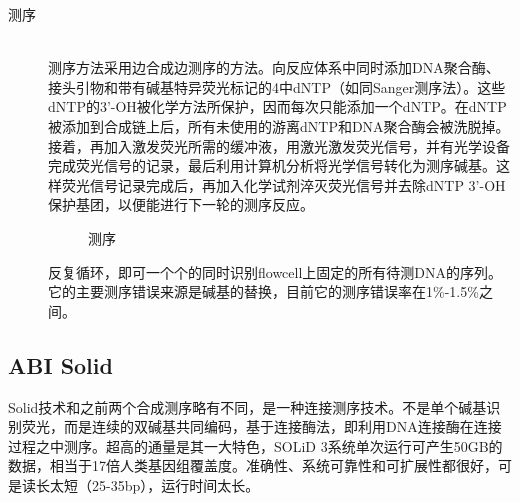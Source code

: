 \documentclass[12pt]{article} %
\begin{document}
\begin{description}
	\item[测序] \hfill \\
	测序方法采用边合成边测序的方法。向反应体系中同时添加DNA聚合酶、接头引物和带有碱基特异荧光标记的4中dNTP（如同Sanger测序法）。这些dNTP的3’-OH被化学方法所保护，因而每次只能添加一个dNTP。在dNTP被添加到合成链上后，所有未使用的游离dNTP和DNA聚合酶会被洗脱掉。接着，再加入激发荧光所需的缓冲液，用激光激发荧光信号，并有光学设备完成荧光信号的记录，最后利用计算机分析将光学信号转化为测序碱基。这样荧光信号记录完成后，再加入化学试剂淬灭荧光信号并去除dNTP 3’-OH保护基团，以便能进行下一轮的测序反应。
	
				\begin{figure}[H] %
		\caption{测序}
		\label{fig:llumina_b}
	\end{figure}
	
	
	反复循环，即可一个个的同时识别flowcell上固定的所有待测DNA的序列。它的主要测序错误来源是碱基的替换，目前它的测序错误率在1\%-1.5\%之间。
\end{description}







\subsection{ABI Solid}



Solid技术和之前两个合成测序略有不同，是一种连接测序技术。不是单个碱基识别荧光，而是连续的双碱基共同编码，基于连接酶法，即利用DNA连接酶在连接过程之中测序。超高的通量是其一大特色，SOLiD 3系统单次运行可产生50GB的数据，相当于17倍人类基因组覆盖度。准确性、系统可靠性和可扩展性都很好，可是读长太短（25-35bp），运行时间太长。
\end{document}

